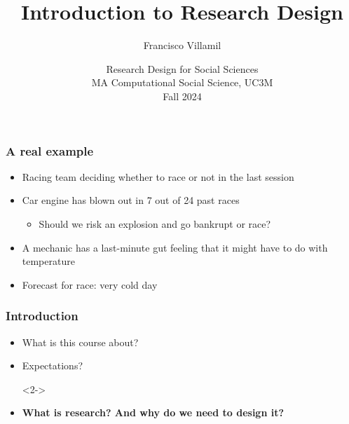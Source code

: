 \documentclass[aspectratio=43]{beamer}
\title[Lecture 1: Introduction to Research Design]{\Large Introduction to Research Design}
\author[]{Francisco Villamil}
\date[]{Research Design for Social Sciences\\MA Computational Social Science, UC3M\\Fall 2024}
\begin{document}

\begin{frame}

  \titlepage

\end{frame}

\begin{frame}
\frametitle{A real example}
\centering

\begin{itemize}
  \item Racing team deciding whether to race or not in the last session
  \item Car engine has blown out in 7 out of 24 past races
  \begin{itemize}
    \item Should we risk an explosion and go bankrupt or race?
  \end{itemize}
  \item A mechanic has a last-minute gut feeling that it might have to do with temperature
  \item Forecast for race: very cold day
\end{itemize}

\end{frame}




\begin{frame}
\frametitle{Introduction}
\centering

\begin{itemize}
  \item<1-> What is this course about?
  \item<1-> Expectations?
  \item[]<2->
  \item<2-> \textbf{What is research? And why do we need to design it?}
\end{itemize}

\end{frame}
\end{document}
